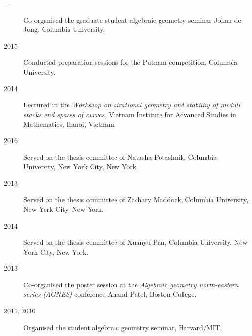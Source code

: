 \documentclass[11pt]{article}
\begin{document}
\begin{description}
\item[{---}] Co-organised the graduate student algebraic geometry seminar Johan de Jong, Columbia University.
\item[{2015}] Conducted preparation sessions for the Putnam competition, Columbia University.
\item[{2014}] Lectured in the \emph{Workshop on birational geometry and stability of moduli stacks and spaces of curves}, Vietnam Institute for Advanced Studies in Mathematics, Hanoi, Vietnam.
\item[{2016}] Served on the thesis committee of Natasha Potashnik, Columbia University, New York City, New York.
\item[{2013}] Served on the thesis committee of Zachary Maddock, Columbia University, New York City, New York.
\item[{2014}] Served on the thesis committee of Xuanyu Pan, Columbia University, New York City, New York.
\item[{2013}] Co-organised the poster session at the \emph{Algebraic geometry north-eastern series (AGNES)} conference Anand Patel, Boston College.
\item[{2011, 2010}] Organised the student algebraic geometry seminar, Harvard/MIT.
\end{description}
\end{document}

